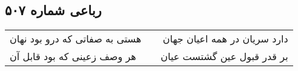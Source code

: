 \begin{center}
\section*{رباعی شماره ۵۰۷}
\label{sec:sh507}
\begin{longtable}{l p{0.5cm} r}
هستی به صفاتی که درو بود نهان
&&
دارد سریان در همه اعیان جهان
\\
هر وصف زعینی که بود قابل آن
&&
بر قدر قبول عین گشتست عیان
\\
\end{longtable}
\end{center}
